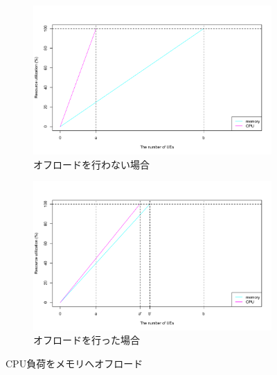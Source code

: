 \documentclass[a4j]{ujarticle}
\begin{document}
\begin{figure}[p]
	\centering
		\begin{subfigure}{1.0\textwidth}
			\centering
			\includegraphics[width=1.0\hsize]{plot1.pdf}
			\caption{オフロードを行わない場合}
			\label{overcpu}
		\end{subfigure}
		\begin{subfigure}{1.0\textwidth}
			\centering
			\includegraphics[width=1.0\hsize]{plot2.pdf}
		  \caption{オフロードを行った場合}
			\label{okcpu}
		\end{subfigure}
		\caption{CPU負荷をメモリへオフロード}
		\label{cpu}
\end{figure}
\clearpage
\end{document}
